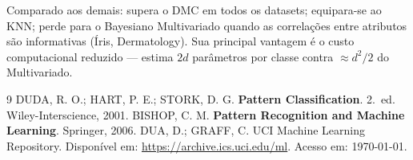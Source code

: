 \documentclass[12pt, a4paper]{article}
\begin{document}
Comparado aos demais: supera o DMC em todos os datasets; equipara-se
ao KNN; perde para o Bayesiano Multivariado quando as correlações entre
atributos são informativas (Íris, Dermatology). Sua principal vantagem
é o custo computacional reduzido — estima $2d$ parâmetros por classe
contra $\approx d^2/2$ do Multivariado.

\newpage
\begin{thebibliography}{9}
     DUDA, R. O.; HART, P. E.; STORK, D. G\@.
        \textbf{Pattern Classification}. 2.~ed. Wiley-Interscience, 2001.
     BISHOP, C. M\@.
        \textbf{Pattern Recognition and Machine Learning}. Springer, 2006.
     DUA, D.; GRAFF, C\@. UCI Machine Learning Repository.
        Disponível em: \url{https://archive.ics.uci.edu/ml}. Acesso em: \today.
\end{thebibliography}
\end{document}
